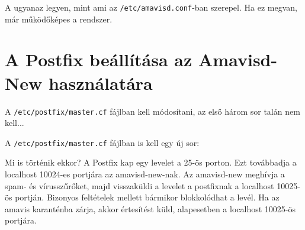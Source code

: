 A  ugyanaz legyen, mint ami az \texttt{/etc/amavisd.conf}-ban szerepel. Ha ez megvan, már
működőképes a rendszer.

\section{A Postfix beállítása az Amavisd-New használatára}

A \texttt{/etc/postfix/master.cf} fájlban kell módosítani, az első három sor talán nem kell...


\noindent A \texttt{/etc/postfix/master.cf} fájlban is kell egy új sor:


Mi is történik ekkor? A Postfix kap egy levelet a 25-ös porton. Ezt továbbadja a localhost 10024-es portjára az
amavisd-new-nak. Az amavisd-new meghívja a spam- és vírusszűrőket, majd visszaküldi a levelet a postfixnak a
localhost 10025-ös portján. Bizonyos feltételek mellett bármikor blokkolódhat a levél. Ha az amavis karanténba zárja,
akkor értesítést küld, alapesetben a localhost 10025-ös portjára.

